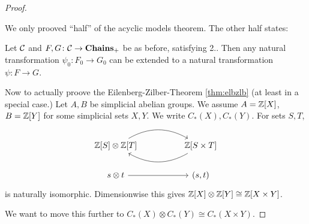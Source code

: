 \documentclass[language=english]{TemplateLecture}
\begin{document}
\begin{proof}
    \begin{Remark}
        We only prooved \enquote{half} of the acyclic models theorem. The other half states:

        Let \(\mathcal{C}\) and \(F,G\colon \mathcal{C} \to \mathbf{Chains}_+\) be as before, satisfying 2.. Then any natural transformation \(\psi_0\colon F_0 \to G_0\) can be extended to a natural transformation \(\psi\colon F \to G\).
    \end{Remark}

    Now to actually proove the Eilenberg-Zilber-Theorem \ref{thm:elbzlb} (at least in a special case.) Let \(A,B\) be simplicial abelian groups. We assume \(A = \mathbb{Z}[X]\), \(B= \mathbb{Z}[Y]\) for some simplicial sets \(X,Y\). We write \(C_*(X), C_*(Y)\). For sets \(S,T\),
    \[\begin{tikzcd}
        \IZ[S] \otimes \IZ[T] \ar[rr, bend left] && \IZ[S \times T] \ar[ll, bend left] \\
        s\otimes t \ar[rr] && (s,t)
    \end{tikzcd}\]
    is naturally isomorphic. Dimensionwise this gives \(\mathbb{Z}[X] \otimes \mathbb{Z}[Y] \cong \mathbb{Z}[X \times Y]\).

    We want to move this further to \(C_*(X) \otimes C_*(Y) \cong C_*(X\times Y)\).


\end{proof}
\end{document}
